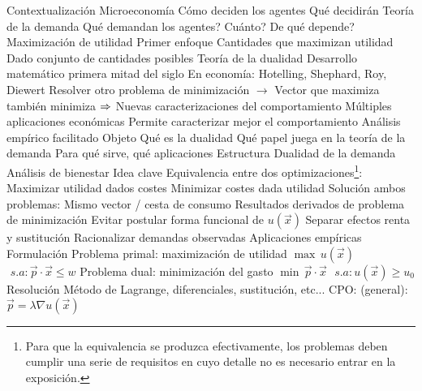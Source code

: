 \documentclass{nuevotema}
\begin{document}
\esquemalargo












\begin{esquemal}
	\1[] 
		\2 Contextualización
			\3 Microeconomía
				\4 Cómo deciden los agentes
				\4 Qué decidirán
			\3 Teoría de la demanda
				\4 Qué demandan los agentes?
				\4 Cuánto?
				\4 De qué depende?
			\3 Maximización de utilidad
				\4 Primer enfoque
				\4 Cantidades que maximizan utilidad
				\4 Dado conjunto de cantidades posibles
			\3 Teoría de la dualidad
				\4 Desarrollo matemático primera mitad del siglo
				\4 En economía:
				\4[] Hotelling, Shephard, Roy, Diewert
				\4 Resolver otro problema de minimización
				\4[] $\to$ Vector que maximiza también minimiza
				\4[] $\Rightarrow$ Nuevas caracterizaciones del comportamiento
				\4 Múltiples aplicaciones económicas
				\4[] Permite caracterizar mejor el comportamiento
				\4 Análisis empírico facilitado
		\2 Objeto
			\3 Qué es la dualidad
			\3 Qué papel juega en la teoría de la demanda
			\3 Para qué sirve, qué aplicaciones
		\2 Estructura
			\3 Dualidad de la demanda
			\3 Análisis de bienestar
	\1 
		\2 Idea clave
			\3 Equivalencia entre dos optimizaciones\footnote{Para que la equivalencia se produzca efectivamente, los problemas deben cumplir una serie de requisitos en cuyo detalle no es necesario entrar en la exposición.}:
				\4 Maximizar utilidad dados costes
				\4 Minimizar costes dada utilidad
				\4[$\Rightarrow$] Solución ambos problemas:
				\4[] Mismo vector / cesta de consumo
			\3 Resultados derivados de problema de minimización
				\4 Evitar postular forma funcional de $u(\vec{x})$
				\4 Separar efectos renta y sustitución
				\4 Racionalizar demandas observadas
				\4 Aplicaciones empíricas
		\2 Formulación
			\3[(i)] Problema primal: maximización de utilidad
				\4[] $\max \, u(\vec{x})$
				\4[] $\, \, s.a: \vec{p} \cdot \vec{x} \leq w$
				\4[] 
			\3[(ii)] Problema dual: minimización del gasto
				\4[] $\min \, \vec{p} \cdot \vec{x}$
				\4[] $\, \, s.a: u(\vec{x}) \geq u_0$
				\4[] 
			\3 Resolución
				\4 Método de Lagrange, diferenciales, sustitución, etc...
				\4[] CPO: (general): $\vec{p} = \lambda \nabla u(\vec{x})$

\end{esquemal}
\end{document}
